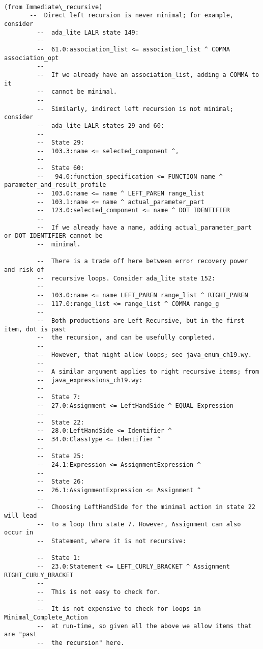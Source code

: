 \documentclass{article}
\begin{document}
\begin{verbatim}

(from Immediate\_recursive)
       --  Direct left recursion is never minimal; for example, consider
         --  ada_lite LALR state 149:
         --
         --  61.0:association_list <= association_list ^ COMMA association_opt
         --
         --  If we already have an association_list, adding a COMMA to it
         --  cannot be minimal.
         --
         --  Similarly, indirect left recursion is not minimal; consider
         --  ada_lite LALR states 29 and 60:
         --
         --  State 29:
         --  103.3:name <= selected_component ^,
         --
         --  State 60:
         --   94.0:function_specification <= FUNCTION name ^ parameter_and_result_profile
         --  103.0:name <= name ^ LEFT_PAREN range_list
         --  103.1:name <= name ^ actual_parameter_part
         --  123.0:selected_component <= name ^ DOT IDENTIFIER
         --
         --  If we already have a name, adding actual_parameter_part or DOT IDENTIFIER cannot be
         --  minimal.

         --  There is a trade off here between error recovery power and risk of
         --  recursive loops. Consider ada_lite state 152:
         --
         --  103.0:name <= name LEFT_PAREN range_list ^ RIGHT_PAREN
         --  117.0:range_list <= range_list ^ COMMA range_g
         --
         --  Both productions are Left_Recursive, but in the first item, dot is past
         --  the recursion, and can be usefully completed.
         --
         --  However, that might allow loops; see java_enum_ch19.wy.
         --
         --  A similar argument applies to right recursive items; from
         --  java_expressions_ch19.wy:
         --
         --  State 7:
         --  27.0:Assignment <= LeftHandSide ^ EQUAL Expression
         --
         --  State 22:
         --  28.0:LeftHandSide <= Identifier ^
         --  34.0:ClassType <= Identifier ^
         --
         --  State 25:
         --  24.1:Expression <= AssignmentExpression ^
         --
         --  State 26:
         --  26.1:AssignmentExpression <= Assignment ^
         --
         --  Choosing LeftHandSide for the minimal action in state 22 will lead
         --  to a loop thru state 7. However, Assignment can also occur in
         --  Statement, where it is not recursive:
         --
         --  State 1:
         --  23.0:Statement <= LEFT_CURLY_BRACKET ^ Assignment RIGHT_CURLY_BRACKET
         --
         --  This is not easy to check for.
         --
         --  It is not expensive to check for loops in Minimal_Complete_Action
         --  at run-time, so given all the above we allow items that are "past
         --  the recursion" here.


\end{verbatim}
\end{document}
